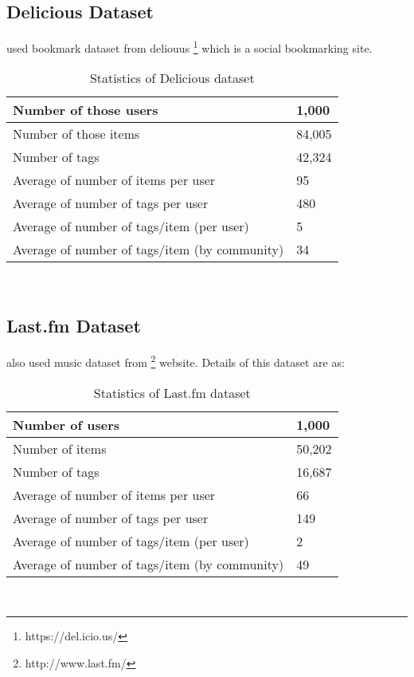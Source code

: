 \subsection{Delicious Dataset}
\cite{N50} used bookmark dataset from deliouus \footnote{https://del.icio.us/} which is a social bookmarking site. 
\\
\begin{table}[!htbp] 
\centering
\footnotesize
\def\arraystretch{1.4}%
\centering
\begin{tabular}{|p{8cm}|p{2cm}|}
\hline
Number of those users & 1,000
\\
\hline 
Number of those items & 84,005
\\
\hline 
Number of tags & 42,324
\\
\hline 
Average of number of items per user & 95
\\
\hline 
Average of number of tags per user & 480
\\
\hline 
Average of number of tags/item (per user) & 5
\\
\hline 
Average of number of tags/item (by community) & 34
\\
\hline
\end{tabular}

\caption{Statistics of Delicious dataset}
\label{table:16}
\end{table}
\\
\subsection{Last.fm Dataset}
\cite{N50} also used music dataset from \footnote{http://www.last.fm/} website. Details of this dataset are as:
\\
\begin{table}[!htbp] 
\centering
\footnotesize
\def\arraystretch{1.4}%
\centering
\begin{tabular}{|p{8cm}|p{2cm}|}
\hline
Number of users & 1,000
\\
\hline 
Number of items & 50,202
\\
\hline 
Number of tags & 16,687
\\
\hline 
Average of number of items per user & 66
\\
\hline 
Average of number of tags per user & 149
\\
\hline 
Average of number of tags/item (per user) & 2
\\
\hline 
Average of number of tags/item (by community) & 49
\\
\hline
\end{tabular}

\caption{Statistics of Last.fm dataset}
\label{table:16}
\end{table}
\\

